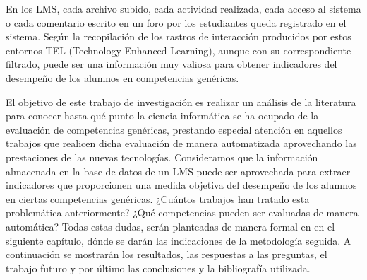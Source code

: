 En los LMS, cada archivo subido, cada actividad realizada, cada acceso al sistema o cada comentario escrito en un foro por los estudiantes queda registrado en el sistema. Según \cite{Chebil:2012, Florian:2011} la recopilación de los rastros de interacción producidos por estos entornos TEL (Technology Enhanced Learning), aunque con su correspondiente filtrado, puede ser una información muy valiosa para obtener indicadores del desempeño de los alumnos en competencias genéricas.

El objetivo de este trabajo de investigación es realizar un análisis de la literatura para conocer hasta qué punto la ciencia informática se ha ocupado de la evaluación de competencias genéricas, prestando especial atención en aquellos trabajos que realicen dicha evaluación de manera automatizada aprovechando las prestaciones de las nuevas tecnologías. Consideramos que la información almacenada en la base de datos de un LMS puede ser aprovechada para extraer indicadores que proporcionen una medida objetiva del desempeño de los alumnos en ciertas competencias genéricas. ¿Cuántos trabajos han tratado esta problemática anteriormente? ¿Qué competencias pueden ser evaluadas de manera automática? Todas estas dudas, serán planteadas de manera formal en en el siguiente capítulo, dónde se darán las indicaciones de la metodología seguida. A continuación se mostrarán los resultados, las respuestas a las preguntas, el trabajo futuro y por último las conclusiones y la bibliografía utilizada.




